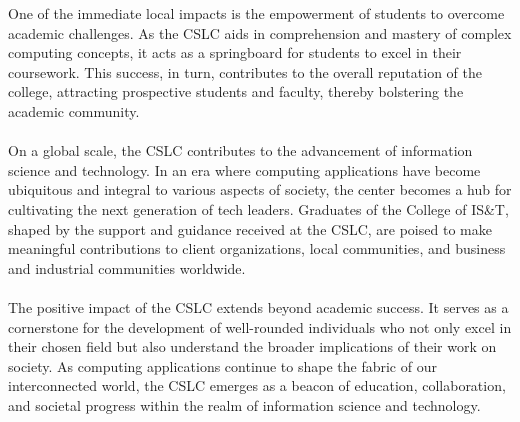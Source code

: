 \documentclass[oneside,openany,obeyspaces]{book}
\newcommand\tab[1][1cm]{\hspace*{#1}}
\begin{document}
\begin{flushleft}
    \tab One of the immediate local impacts is the empowerment of students to overcome academic challenges. As the CSLC aids in comprehension and mastery of complex computing concepts, it acts as a springboard for students to excel in their coursework. This success, in turn, contributes to the overall reputation of the college, attracting prospective students and faculty, thereby bolstering the academic community.\\~\\

    \tab On a global scale, the CSLC contributes to the advancement of information science and technology. In an era where computing applications have become ubiquitous and integral to various aspects of society, the center becomes a hub for cultivating the next generation of tech leaders. Graduates of the College of IS\&T, shaped by the support and guidance received at the CSLC, are poised to make meaningful contributions to client organizations, local communities, and business and industrial communities worldwide.\\~\\

    \tab The positive impact of the CSLC extends beyond academic success. It serves as a cornerstone for the development of well-rounded individuals who not only excel in their chosen field but also understand the broader implications of their work on society. As computing applications continue to shape the fabric of our interconnected world, the CSLC emerges as a beacon of education, collaboration, and societal progress within the realm of information science and technology.\\~\\






\end{flushleft}
\end{document}
